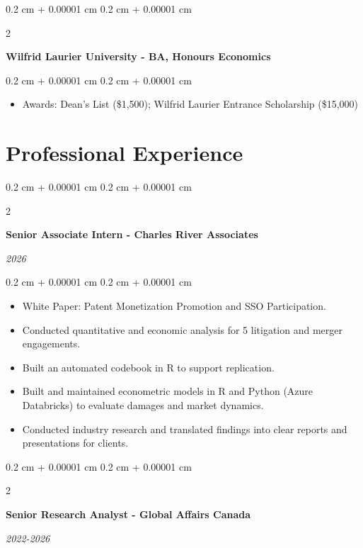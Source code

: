\documentclass[10pt, a4paper]{article}
\newenvironment{highlights}{
    \begin{itemize}[
        topsep=0.10 cm,
        parsep=0.10 cm,
        partopsep=0pt,
        itemsep=0pt,
        leftmargin=0.4 cm + 10pt
    ]
}{
    \end{itemize}
} %
\newenvironment{onecolentry}{
    \begin{adjustwidth}{
        0.2 cm + 0.00001 cm
    }{
        0.2 cm + 0.00001 cm
    }
}{
    \end{adjustwidth}
} %
\newenvironment{twocolentry}[2][]{
    \onecolentry
    \def\secondColumn{#2}
    \setcolumnwidth{\fill, 4.5 cm}
    \begin{paracol}{2}
}{
    \switchcolumn \raggedleft \secondColumn
    \end{paracol}
    \endonecolentry
} %
\begin{document}
\vspace{0.2 cm}
        \begin{twocolentry}{
 
        }
            \textbf{Wilfrid Laurier University - BA, Honours Economics}
            
        \end{twocolentry}

        \vspace{0.10 cm}
        \begin{onecolentry}
            \begin{highlights}
                \item Awards: Dean's List (\$1,500); Wilfrid Laurier Entrance Scholarship (\$15,000)
            \end{highlights}
        \end{onecolentry}

        \section{Professional Experience}

        \begin{twocolentry}{
\textit{2026}}
    \textbf{Senior Associate Intern - Charles River Associates}
\end{twocolentry}
\begin{onecolentry}
    \begin{highlights}
        \item White Paper: Patent Monetization Promotion and SSO Participation.
        \item Conducted quantitative and economic analysis for 5 litigation and merger engagements.
        \item Built an automated codebook in R to support replication.
        \item Built and maintained econometric models in R and Python (Azure Databricks) to evaluate damages and market dynamics.
        \item Conducted industry research and translated findings into clear reports and presentations for clients.
    \end{highlights}
    \end{onecolentry}
    \vspace{0.2 cm}
            
        \begin{twocolentry}{ \textit{2022-2026}}
            \textbf{Senior Research Analyst - Global Affairs Canada}
        \end{twocolentry}
\end{document}
